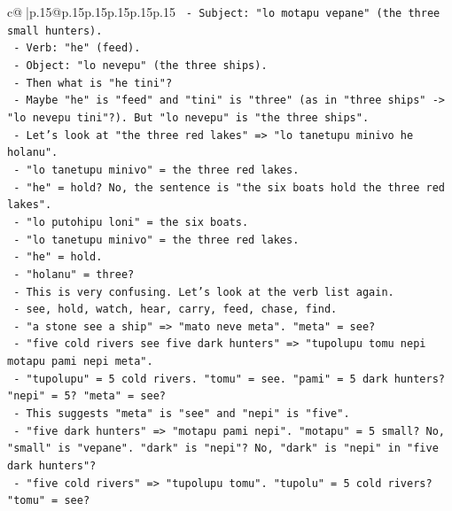 \documentclass{article}
\begin{document}
{\begin{supertabular}{c@{$\;$}|p{.15\linewidth}@{}p{.15\linewidth}p{.15\linewidth}p{.15\linewidth}p{.15\linewidth}p{.15\linewidth}}
{{{\texttt{                {-} Subject: "lo motapu vepane" (the three small hunters).} \\
\texttt{                {-} Verb: "he" (feed).} \\
\texttt{                {-} Object: "lo nevepu" (the three ships).} \\
\texttt{                {-} Then what is "he tini"?} \\
\texttt{                {-} Maybe "he" is "feed" and "tini" is "three" (as in "three ships" {-}> "lo nevepu tini"?). But "lo nevepu" is "the three ships".} \\
\texttt{                {-} Let's look at "the three red lakes" => "lo tanetupu minivo he holanu".} \\
\texttt{                  {-} "lo tanetupu minivo" = the three red lakes.} \\
\texttt{                  {-} "he" = hold? No, the sentence is "the six boats hold the three red lakes".} \\
\texttt{                  {-} "lo putohipu loni" = the six boats.} \\
\texttt{                  {-} "lo tanetupu minivo" = the three red lakes.} \\
\texttt{                  {-} "he" = hold.} \\
\texttt{                  {-} "holanu" = three?} \\
\texttt{                {-} This is very confusing. Let's look at the verb list again.} \\
\texttt{                  {-} see, hold, watch, hear, carry, feed, chase, find.} \\
\texttt{                {-} "a stone see a ship" => "mato neve meta". "meta" = see?} \\
\texttt{                  {-} "five cold rivers see five dark hunters" => "tupolupu tomu nepi motapu pami nepi meta".} \\
\texttt{                  {-} "tupolupu" = 5 cold rivers. "tomu" = see. "pami" = 5 dark hunters? "nepi" = 5? "meta" = see?} \\
\texttt{                  {-} This suggests "meta" is "see" and "nepi" is "five".} \\
\texttt{                  {-} "five dark hunters" => "motapu pami nepi". "motapu" = 5 small? No, "small" is "vepane". "dark" is "nepi"? No, "dark" is "nepi" in "five dark hunters"?} \\
\texttt{                  {-} "five cold rivers" => "tupolupu tomu". "tupolu" = 5 cold rivers? "tomu" = see?} \\
}}}
\end{supertabular}}
\end{document}

